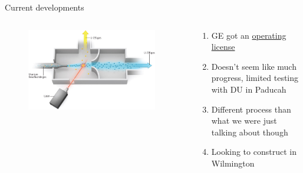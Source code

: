 \documentclass[aspectratio=1610,pdftex,dvipsnames,compress,xcolor={dvipsnames}]{beamer}
\begin{document}
\begin{frame}{Current developments}
    \begin{columns}[t]

        \begin{column}{0.45\textwidth}
            \begin{figure}
                \centering
                \includegraphics[width=0.95\textwidth]{laser.enrichment.jpg}
            \end{figure}
        \end{column}

        \begin{column}{0.55\textwidth}
            \begin{enumerate}[series=outerlist,topsep=0pt,itemsep=15pt,leftmargin=*,label=(\arabic*)]
                \item[]GE got an \href{https://www.world-nuclear-news.org/Articles/US-government-approves-GLE-restructure}{operating license}
                \item[]Doesn't seem like much progress, limited testing with DU in Paducah
                \item[]Different process than what we were just talking about though 
                \item[]Looking to construct in Wilmington
            \end{enumerate}
        \end{column}

    \end{columns}
\end{frame}
\end{document}
